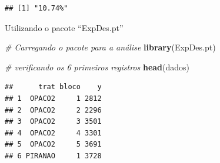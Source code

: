 \documentclass[
]{book}
\newenvironment{Shaded}{\begin{snugshade}}{\end{snugshade}}
\newcommand{\CommentTok}[1]{\textcolor[rgb]{0.56,0.35,0.01}{\textit{#1}}}
\newcommand{\DataTypeTok}[1]{\textcolor[rgb]{0.13,0.29,0.53}{#1}}
\newcommand{\KeywordTok}[1]{\textcolor[rgb]{0.13,0.29,0.53}{\textbf{#1}}}
\newcommand{\NormalTok}[1]{#1}
\newcommand{\OperatorTok}[1]{\textcolor[rgb]{0.81,0.36,0.00}{\textbf{#1}}}
\newcommand{\StringTok}[1]{\textcolor[rgb]{0.31,0.60,0.02}{#1}}
\begin{document}
\begin{verbatim}
## [1] "10.74%"
\end{verbatim}

Utilizando o pacote ``ExpDes.pt''

\begin{Shaded}
\begin{Highlighting}[]
\CommentTok{# Carregando o pacote para a análise}
\KeywordTok{library}\NormalTok{(ExpDes.pt)}

\CommentTok{# verificando os 6 primeiros registros}
\KeywordTok{head}\NormalTok{(dados)}
\end{Highlighting}
\end{Shaded}

\begin{verbatim}
##      trat bloco    y
## 1  OPACO2     1 2812
## 2  OPACO2     2 2296
## 3  OPACO2     3 3501
## 4  OPACO2     4 3301
## 5  OPACO2     5 3691
## 6 PIRANAO     1 3728
\end{verbatim}

\begin{Shaded}
\end{Shaded}
\end{document}
